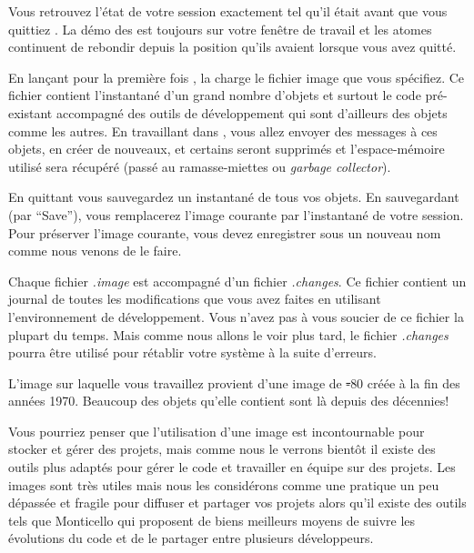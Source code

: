 \documentclass[a4paper,10pt,twoside]{book}
\begin{document}

Vous retrouvez l'état de votre session exactement tel qu'il était
avant que vous quittiez \pharo. La démo des \bamfr{} est toujours sur votre
fenêtre de travail et les atomes continuent de rebondir depuis la position
qu'ils avaient lorsque vous avez quitté.

En lançant pour la première fois \pharo, la 
charge le fichier image que vous spécifiez. Ce fichier contient
l'instantané d'un grand nombre d'objets et surtout le code
pré-existant accompagné des outils de développement qui sont
d'ailleurs des objets comme les autres. En travaillant dans \pharo, vous
allez envoyer des messages à ces objets, en créer de nouveaux, et
certains seront supprimés et l'espace-mémoire utilisé sera récupéré
(\ie passé au ramasse-miettes ou \emph{garbage collector}).

En quittant \pharo vous sauvegardez un instantané de tous vos objets. 
En sauvegardant (par ``Save''), vous remplacerez l'image courante par 
l'instantané de votre session. Pour préserver l'image courante, vous 
devez enregistrer sous un nouveau nom comme nous venons de le faire.

Chaque fichier \emph{.image} est accompagné d'un fichier \emph{.changes}.
Ce fichier contient un journal de toutes les modifications que vous avez 
faites en utilisant l'environnement de développement.
Vous n'avez pas à vous soucier de ce fichier la plupart du temps.
Mais comme nous allons le voir plus tard, le fichier \emph{.changes} 
pourra être utilisé pour rétablir votre système \pharo à la suite d'erreurs.

L'image sur laquelle vous travaillez provient d'une image de \st-80 créée 
à la fin des années 1970. Beaucoup des objets qu'elle contient sont là 
depuis des décennies!

Vous pourriez penser que l'utilisation d'une image est incontournable pour 
stocker et gérer des projets, mais comme nous le verrons bientôt il existe 
des outils plus adaptés pour gérer le code et travailler en équipe sur des projets.
Les images sont très utiles mais nous les considérons comme une pratique un peu 
dépassée et fragile pour diffuser et partager vos projets alors qu'il existe 
des outils tels que Monticello qui proposent de biens meilleurs moyens de 
suivre les évolutions du code et de le partager entre plusieurs développeurs.

\end{document}
